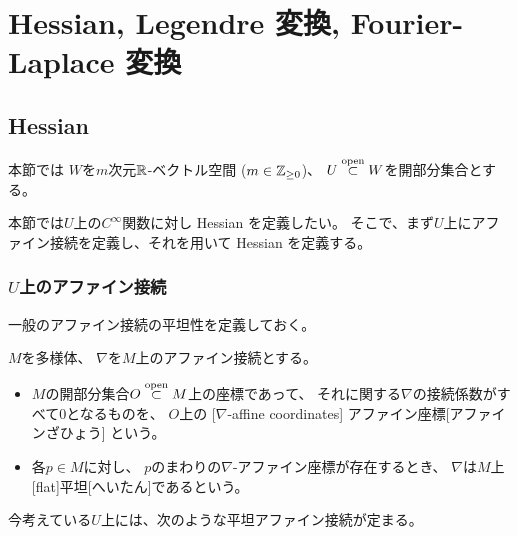 \documentclass[report]{jlreq}
\begin{document}
%
\chapter{Hessian, Legendre 変換, Fourier-Laplace 変換}

%
\section{Hessian}

本節では
$W$を$m$次元$\mathbb{R}$-ベクトル空間 ($m \in \mathbb{Z}_{\ge 0}$)、
$U \stackrel{\text{open}}{\subset} W$を開部分集合とする。

本節では$U$上の$C^\infty$関数に対し Hessian を定義したい。
そこで、まず$U$上にアファイン接続を定義し、それを用いて Hessian を定義する。

\subsection{$U$上のアファイン接続}

一般のアファイン接続の平坦性を定義しておく。

\begin{definition}[平坦アファイン接続]
    $M$を多様体、
    $\nabla$を$M$上のアファイン接続とする。
    \begin{itemize}
        \item $M$の開部分集合$O \stackrel{\text{open}}{\subset} M$上の座標であって、
            それに関する$\nabla$の接続係数がすべて$0$となるものを、
            $O$上の
            [$\nabla$-affine coordinates]
                {アファイン座標}[アファインざひょう]
            という。
        \item 各$p \in M$に対し、
            $p$のまわりの$\nabla$-アファイン座標が存在するとき、
            $\nabla$は$M$上
            [flat]{平坦}[へいたん]であるという。
    \end{itemize}
\end{definition}

今考えている$U$上には、次のような平坦アファイン接続が定まる。
\end{document}
